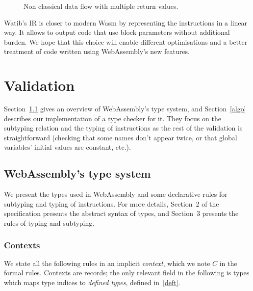 \documentclass[a4paper,11pt]{article}
\begin{document}
\begin{figure}[h]
  \centering
  \caption{Non classical data flow with multiple return values.}\label{data-flow}
\end{figure}

\textsf{Watib}'s IR is closer to modern Wasm by representing the instructions in
a linear way. It allows to output code that use block parameters without
additional burden. We hope that this choice will enable different optimisations
and a better treatment of code written using WebAssembly's new features.

\section{Validation}\label{val}
Section~\ref{type} gives an overview of WebAssembly's type system, and
Section~\ref{algo} describes our implementation of a type checker for it. They
focus on the subtyping relation and the typing of instructions as the rest of
the validation is straightforward (checking that some names don't appear twice,
or that global variables' initial values are constant, etc.).
\subsection{WebAssembly's type system}\label{type}
We present the types used in WebAssembly and some declarative rules for
subtyping and typing of instructions. For more details, Section~2 of the
specification presents the abstract syntax of types, and Section~3 presents the
rules of typing and subtyping.
\subsubsection{Contexts}
We state all the following rules in an implicit \emph{context}, which we note
$C$ in the formal rules. Contexts are records; the only relevant field in the
following is \textsf{types} which maps type indices to \emph{defined types},
defined in~\ref{deft}.
\end{document}
